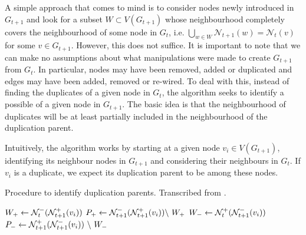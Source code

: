 \documentclass[
	fontsize=10pt, %
	twoside=false, %
	secnumdepth=1, %
  toc=indentunnumbered %
]{kaobook}
\begin{document}
A simple approach that comes to mind is to consider nodes newly introduced in
$G_{t+1}$ and look for a subset $W \subset V(G_{t+1})$ whose neighbourhood
completely covers the neighbourhood of some node in $G_{t}$, i.e. $\bigcup_{w
  \in W} \mathcal{N}_{t+1}(w) = \mathcal{N}_t(v)$ for some $v \in G_{t+1}$.
However, this does not suffice. It is important to note that we can make no
assumptions about what manipulations were made to create $G_{t+1}$ from $G_t$.
In particular, nodes may have been removed, added or duplicated and edges may
have been added, removed or re-wired.
%
To deal with this, instead of finding the duplicates of a given node in
$G_{t}$, the algorithm seeks to identify a possible  of
a given node in $G_{t+1}$. The basic idea is that the neighbourhood of
duplicates will be at least partially included in the neighbourhood of the
duplication parent.

Intuitively, the algorithm works by starting at a given node $v_i \in
V(G_{t+1})$, identifying its neighbour nodes in $G_{t+1}$ and considering their
neighbours in $G_t$. If $v_i$ is a duplicate, we expect its duplication parent
to be among these nodes.

\begin{algorithm}[h]
  \DontPrintSemicolon
  \label{alg:identify-duplicates}
  \caption{ Procedure to identify duplication parents. Transcribed from
    \citeauthor{nielsen_MachineLearningSupport_2019} \cite{nielsen_MachineLearningSupport_2019}.
  }
     $W_+ \gets \mathcal{N}_t^- ( \mathcal{N}_{t+1}^+(v_i) )$ \; $P_+ \gets
  \mathcal{N}_{t+1}^- ( \mathcal{N}_{t+1}^+(v_i) ) \backslash~ W_+$ \; $W_- \gets
  \mathcal{N}_t^+ ( \mathcal{N}_{t+1}^-(v_i) ) $ \; $P_- \gets \mathcal{N}_{t+1}^+ (
  \mathcal{N}_{t+1}^-(v_i) ) ~\backslash~ W_- $\;
\end{algorithm}
\end{document}
